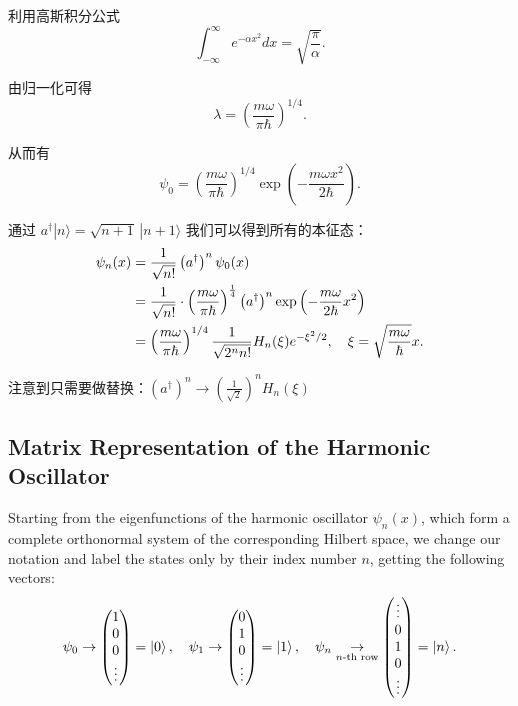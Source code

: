 利用高斯积分公式
\begin{equation}
	\int_{-\infty}^{\infty} e^{-\alpha x^{2}} dx = \sqrt{\frac{\pi}{\alpha}}.
\end{equation}

由归一化可得
\begin{equation}
	\lambda = \left( \frac{m \omega}{\pi \hbar} \right)^{1/4}.
\end{equation}

从而有
\begin{equation}
	\psi_{0} = \left( \frac{m \omega}{\pi \hbar} \right)^{1/4} \exp \left( -\frac{m \omega x^{2}}{2 \hbar} \right).
\end{equation}

通过 $\displaystyle a^\dag| n \rangle = \sqrt{n+1}\,| n+1 \rangle$ 我们可以得到所有的本征态：
\begin{align}
	\psi_{n}(x) &= \frac{1}{\sqrt{n !}}\left(a^{\dagger}\right)^{n}\psi_{0}(x) \notag \\
	&= \frac{1}{\sqrt{n !}} \cdot \left(\frac{m \omega}{\pi \hbar}\right)^{\frac{1}{4}} \left(a^{\dagger}\right)^{n} \exp \left(-\frac{m \omega}{2 \hbar} x^{2}\right) \notag \\
	&= \left( \frac{m\omega}{\pi\hbar} \right)^{1/4} \frac{1}{\sqrt{2^{n} n!}} H_{n}(\xi) e^{-\xi^{2}/2}, \quad \xi={\sqrt {\frac{{m\omega }}{\hbar }} x}.
\end{align}

注意到只需要做替换：$\displaystyle (a^\dag)^n \to (\frac{1}{{\sqrt 2 }})^n{H_n}\left( \xi  \right) $

\subsection{Matrix Representation of the Harmonic Oscillator}

Starting from the eigenfunctions of the harmonic oscillator ${\psi_{n}(x)}$, which form a complete orthonormal system of the corresponding Hilbert space, we change our notation and label the states only by their index number $n$, getting the following vectors:
\begin{equation}
	\psi_{0} \to\begin{pmatrix}1 \\ 0 \\ 0 \\ \vdots\end{pmatrix}=\ket{0}, \quad \psi_{1} \to\begin{pmatrix}0 \\ 1 \\ 0 \\ \vdots \end{pmatrix}=\ket{1}, \quad \psi_{n} \underset{n\text{-th row}}{\to}\begin{pmatrix}\vdots \\ 0 \\ 1 \\ 0 \\ \vdots \end{pmatrix}=\ket{n} .
\end{equation}

